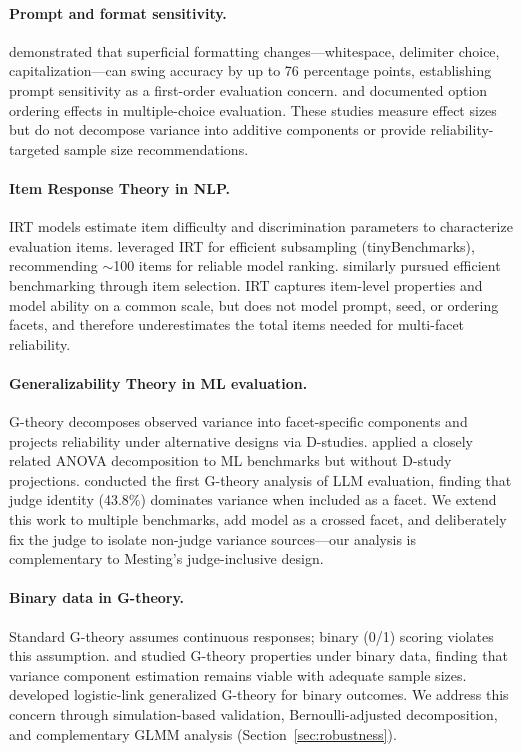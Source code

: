 \documentclass[11pt]{article}
\begin{document}
\paragraph{Prompt and format sensitivity.}
\citet{sclar2024} demonstrated that superficial formatting changes---whitespace, delimiter choice, capitalization---can swing accuracy by up to 76 percentage points, establishing prompt sensitivity as a first-order evaluation concern.
\citet{lu2022} and \citet{pezeshkpour2024} documented option ordering effects in multiple-choice evaluation.
These studies measure effect sizes but do not decompose variance into additive components or provide reliability-targeted sample size recommendations.

\paragraph{Item Response Theory in NLP.}
IRT models \citep{lalor2019,vania2021,rodriguez2021} estimate item difficulty and discrimination parameters to characterize evaluation items.
\citet{polo2024} leveraged IRT for efficient subsampling (tinyBenchmarks), recommending $\sim$100 items for reliable model ranking.
\citet{perlitz2023} similarly pursued efficient benchmarking through item selection.
IRT captures item-level properties and model ability on a common scale, but does not model prompt, seed, or ordering facets, and therefore underestimates the total items needed for multi-facet reliability.

\paragraph{Generalizability Theory in ML evaluation.}
G-theory \citep{shavelson1991,brennan2001} decomposes observed variance into facet-specific components and projects reliability under alternative designs via D-studies.
\citet{bouthillier2021} applied a closely related ANOVA decomposition to ML benchmarks but without D-study projections.
\citet{mesting2026} conducted the first G-theory analysis of LLM evaluation, finding that judge identity (43.8\%) dominates variance when included as a facet.
We extend this work to multiple benchmarks, add model as a crossed facet, and deliberately fix the judge to isolate non-judge variance sources---our analysis is complementary to Mesting's judge-inclusive design.

\paragraph{Binary data in G-theory.}
Standard G-theory assumes continuous responses; binary (0/1) scoring violates this assumption.
\citet{mushquash2006} and \citet{shavelson1989} studied G-theory properties under binary data, finding that variance component estimation remains viable with adequate sample sizes.
\citet{jiang2017} developed logistic-link generalized G-theory for binary outcomes.
We address this concern through simulation-based validation, Bernoulli-adjusted decomposition, and complementary GLMM analysis (Section~\ref{sec:robustness}).
\end{document}
